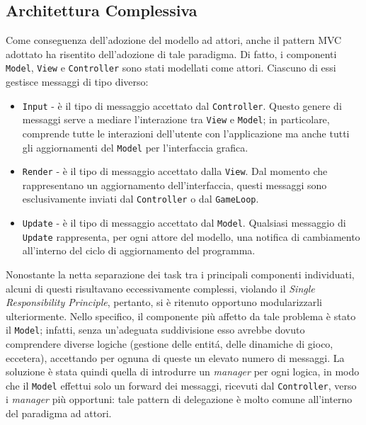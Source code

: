 \subsection{Architettura Complessiva}
Come conseguenza dell'adozione del modello ad attori, anche il pattern MVC adottato ha risentito dell'adozione di tale
paradigma. Di fatto, i componenti \texttt{Model}, \texttt{View} e \texttt{Controller} sono stati modellati come attori.
Ciascuno di essi gestisce messaggi di tipo diverso:
\begin{itemize}
    \item \texttt{Input} - è il tipo di messaggio accettato dal \texttt{Controller}. Questo genere di messaggi serve a mediare l'interazione tra \texttt{View} e \texttt{Model}; in particolare, comprende tutte le interazioni dell'utente con l'applicazione ma anche tutti gli aggiornamenti del \texttt{Model} per l'interfaccia grafica.
    \item \texttt{Render} - è il tipo di messaggio accettato dalla \texttt{View}. Dal momento che rappresentano un aggiornamento dell'interfaccia, questi messaggi sono esclusivamente inviati dal \texttt{Controller} o dal \texttt{GameLoop}.
    \item \texttt{Update} - è il tipo di messaggio accettato dal \texttt{Model}. Qualsiasi messaggio di \texttt{Update} rappresenta, per ogni attore del modello, una notifica di cambiamento all'interno del ciclo di aggiornamento del programma.
\end{itemize}
Nonostante la netta separazione dei task tra i principali componenti individuati, alcuni di questi risultavano
eccessivamente complessi, violando il \textit{Single Responsibility Principle}, pertanto, si è ritenuto opportuno
modularizzarli ulteriormente. Nello specifico, il componente più affetto da tale problema è stato il \texttt{Model};
infatti, senza un'adeguata suddivisione esso avrebbe dovuto comprendere diverse logiche (gestione delle entitá, delle
dinamiche di gioco, eccetera), accettando per ognuna di queste un elevato numero di messaggi. La soluzione è stata
quindi quella di introdurre un \textit{manager} per ogni logica, in modo che il \texttt{Model} effettui solo un
forward dei messaggi, ricevuti dal \texttt{Controller}, verso i \textit{manager} più opportuni: tale pattern di
delegazione è molto comune all'interno del paradigma ad attori.

